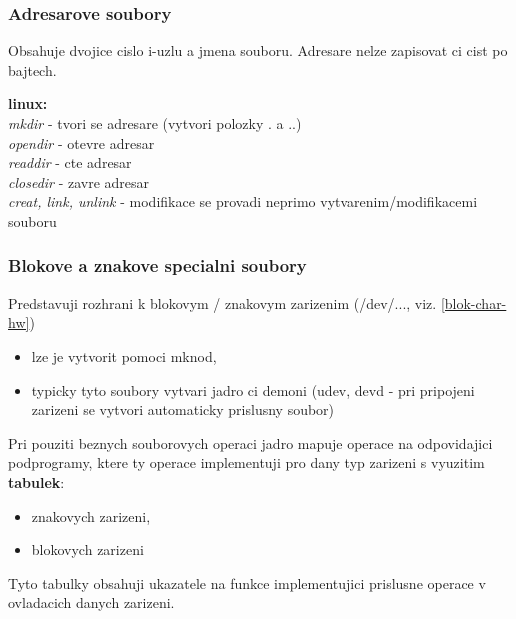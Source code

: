 \documentclass[a4paper, 11pt]{article}
\begin{document}
\subsubsection{Adresarove soubory}
Obsahuje dvojice cislo i-uzlu a jmena souboru. Adresare nelze zapisovat ci cist po bajtech.

\textbf{linux:} \\[0.5em]
\textit{mkdir} - tvori se adresare (vytvori polozky . a ..) \\[0.2em]
\textit{opendir} - otevre adresar \\[0.2em]
\textit{readdir} - cte adresar \\[0.2em]
\textit{closedir} - zavre adresar \\[0.2em]
\textit{creat, link, unlink} - modifikace se provadi neprimo vytvarenim/modifikacemi souboru \\

\subsubsection{Blokove a znakove specialni soubory}
Predstavuji rozhrani k blokovym / znakovym zarizenim (/dev/..., viz. \ref{blok-char-hw})
\begin{itemize}
    \item lze je vytvorit pomoci mknod,
    \item typicky tyto soubory vytvari jadro ci demoni (udev, devd - pri pripojeni zarizeni se vytvori automaticky prislusny soubor) \\
\end{itemize}

Pri pouziti beznych souborovych operaci jadro mapuje operace na odpovidajici podprogramy, ktere ty operace implementuji pro dany typ zarizeni s vyuzitim \textbf{tabulek}:
\begin{itemize}
    \item znakovych zarizeni,
    \item blokovych zarizeni \\
\end{itemize}

Tyto tabulky obsahuji ukazatele na funkce implementujici prislusne operace v ovladacich danych zarizeni. \\
\end{document}
